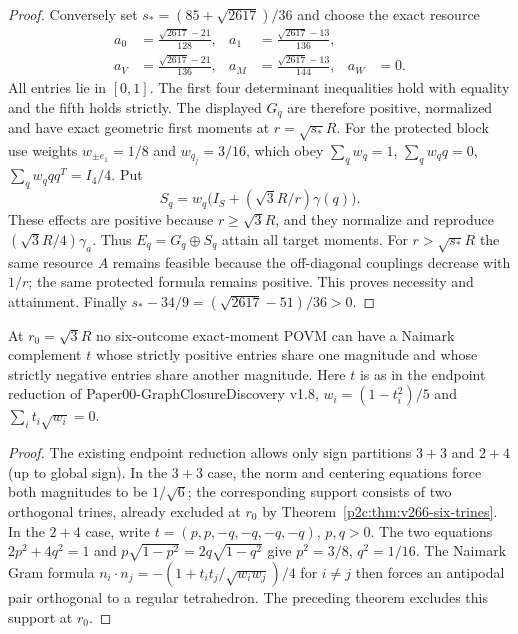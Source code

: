 \documentclass[12pt,a4paper]{article}
\begin{document}
\begin{proof}
Conversely set $s_*=(85+\sqrt{2617})/36$ and choose the exact resource
\[
\boxed{
\begin{aligned}
a_0&=\frac{\sqrt{2617}-21}{128},&
a_1&=\frac{\sqrt{2617}-13}{136},\\
a_V&=\frac{\sqrt{2617}-21}{136},&
a_M&=\frac{\sqrt{2617}-13}{144},&a_W&=0.
\end{aligned}}
\]
All entries lie in $[0,1]$. The first four determinant inequalities
hold with equality and the fifth holds strictly. The displayed $G_q$
are therefore positive, normalized and have exact geometric first moments
at $r=\sqrt{s_*}R$. For the protected block use weights
$w_{\pm e_1}=1/8$ and $w_{q_j}=3/16$, which obey
$\sum_qw_q=1$, $\sum_qw_qq=0$,
$\sum_qw_qqq^T=I_4/4$. Put
\[
S_q=w_q\bigl(I_S+(\sqrt3R/r)\gamma(q)\bigr).
\]
These effects are positive because $r\ge\sqrt3R$, and they normalize
and reproduce $(\sqrt3R/4)\gamma_a$. Thus $E_q=G_q\oplus S_q$
attain all target moments. For $r>\sqrt{s_*}R$ the same resource $A$
remains feasible because the off-diagonal couplings decrease with $1/r$;
the same protected formula remains positive. This proves necessity and
attainment. Finally $s_*-34/9=(\sqrt{2617}-51)/36>0$.
\end{proof}

\begin{corollary}
\label{p2c:cor:gc19-two-level-no-go}
At $r_0=\sqrt3R$ no six-outcome exact-moment POVM can have a Naimark
complement $t$ whose strictly positive entries share one magnitude and
whose strictly negative entries share another magnitude. Here $t$ is
as in the endpoint reduction of Paper00-GraphClosureDiscovery v1.8,
$w_i=(1-t_i^2)/5$ and
$\sum_it_i\sqrt{w_i}=0$.
\end{corollary}
\begin{proof}
The existing endpoint reduction allows only sign partitions $3+3$
and $2+4$ (up to global sign). In the $3+3$ case, the norm and
centering equations force both magnitudes to be $1/\sqrt6$;
the corresponding support consists of two orthogonal trines, already
excluded at $r_0$ by Theorem~\ref{p2c:thm:v266-six-trines}.
In the $2+4$ case, write $t=(p,p,-q,-q,-q,-q)$, $p,q>0$.
The two equations
$2p^2+4q^2=1$ and $p\sqrt{1-p^2}=2q\sqrt{1-q^2}$
give $p^2=3/8$, $q^2=1/16$.
The Naimark Gram formula
$n_i\cdot n_j=-(1+t_it_j/\sqrt{w_iw_j})/4$ for $i\ne j$
then forces an antipodal pair orthogonal to a regular tetrahedron.
The preceding theorem excludes this support at $r_0$.
\end{proof}
\end{document}
